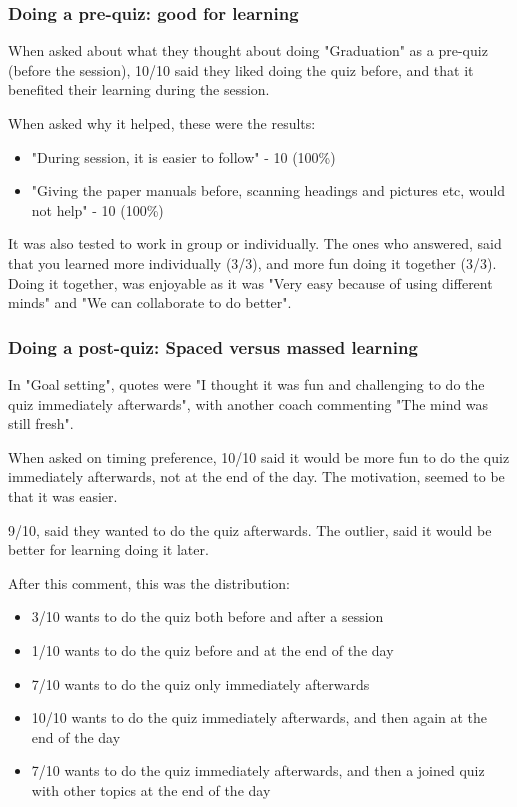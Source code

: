     \subsubsection{Doing a pre-quiz: good for learning}
    When asked about what they thought about doing "Graduation" as a pre-quiz (before the session), 10/10 said they liked doing the quiz before, and that it benefited their learning during the session.

    When asked why it helped, these were the results:

    \begin{itemize}
    \item "During session, it is easier to follow" - 10 (100\%)
    \item "Giving the paper manuals before, scanning headings and pictures etc, would not help" - 10 (100\%)
    \end{itemize}

    It was also tested to work in group or individually. The ones who answered, said that you learned more individually (3/3), and more fun doing it together (3/3). Doing it together, was enjoyable as it was "Very easy because of using different minds" and "We can collaborate to do better".

    \subsubsection{Doing a post-quiz: Spaced versus massed learning}
    In "Goal setting", quotes were "I thought it was fun and challenging to do the quiz immediately afterwards", with another coach commenting "The mind was still fresh".

    When asked on timing preference, 10/10 said it would be more fun to do the quiz immediately afterwards, not at the end of the day. The motivation, seemed to be that it was easier.

    9/10, said they wanted to do the quiz afterwards. The outlier, said it would be better for learning doing it later.

    After this comment, this was the distribution:

    \begin{itemize}
    \item 3/10 wants to do the quiz both before and after a session
    \item 1/10 wants to do the quiz before and at the end of the day
    \item 7/10 wants to do the quiz only immediately afterwards
    \item 10/10 wants to do the quiz immediately afterwards, and then again at the end of the day
    \item 7/10 wants to do the quiz immediately afterwards, and then a joined quiz with other topics at the end of the day
    \end{itemize}

